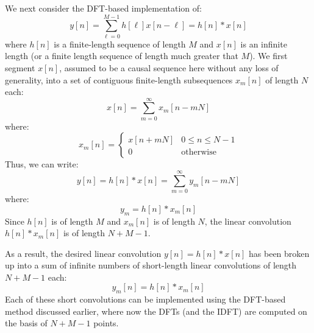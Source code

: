 \documentclass[../../main/main.tex]{subfiles}
\begin{document}
We next consider the DFT-based implementation of:
\begin{equation}
    y[n]
    =
    \sum_{\ell=0}^{M-1} h[\ell] x[n-\ell]
    =
    h[n] * x[n]
    \label{eq:L13_S18_1}
\end{equation}
where \( h[n] \) is a finite-length sequence of length \( M \) and \( x[n] \) is an infinite length (or a finite length sequence of length much greater that \( M \)).
We first segment \( x[n] \), assumed to be a causal sequence here without any loss of generality, into a set of contiguous finite-length subsequences \( x_{m}[n] \) of length \( N \) each:
\begin{equation}
    x[n]
    =
    \sum_{m=0}^{\infty} x_{m}[n-mN]
    \label{eq:L13_S19_1}
\end{equation}
where:
\begin{equation}
    x_{m}[n]
    =
    \begin{cases}
        x[n+mN] &   0 \le n \le N-1 \\
        0       &   \text{otherwise}
    \end{cases}
    \label{eq:L13_S19_2}
\end{equation}
Thus, we can write:
\begin{equation}
    y[n]
    =
    h[n] * x[n]
    =
    \sum_{m=0}^{\infty} y_{m}[n-mN]
    \label{eq:L13_S20_1}
\end{equation}
where:
\begin{equation}
    y_{m}
    =
    h[n] * x_{m}[n]
    \label{eq:L13_S20_2}
\end{equation}
Since \( h[n] \) is of length \( M \) and \( x_{m}[n] \) is of length \( N \), the linear convolution \( h[n] * x_{m}[n] \) is of length \( N + M - 1 \).

As a result, the desired linear convolution \( y[n] = h[n] * x[n] \) has been broken up into a sum of infinite numbers of short-length linear convolutions of length \( N + M - 1 \) each:
\begin{equation}
    y_{m}[n]
    =
    h[n] * x_{m}[n]
    \label{eq:L13_S21_1}
\end{equation}
Each of these short convolutions can be implemented using the DFT-based method discussed earlier, where now the DFTs (and the IDFT) are computed on the basis of \( N + M - 1 \) points.
\end{document}
